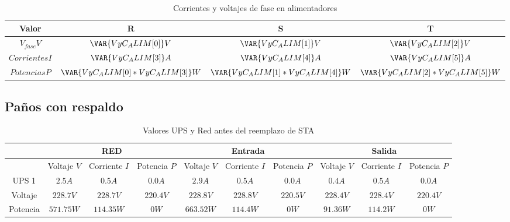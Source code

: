 \documentclass{article}
\begin{document}
\begin{center}
    \begin{table}[H]
        \centering
        \begin{tabular}{c c c c}
            Valor & R & S & T \\\hline
            $V_{fase}V$ & $\VAR{VyC_ALIM[0]} V$ & $\VAR{VyC_ALIM[1]} V$  & $\VAR{VyC_ALIM[2]} V$ \\
            $Corrientes I$ & $\VAR{VyC_ALIM[3]} A$  & $\VAR{VyC_ALIM[4]} A$  & $\VAR{VyC_ALIM[5]} A$ \\
	    $Potencias P$ & $\VAR{VyC_ALIM[0]*VyC_ALIM[3]} W$ & $\VAR{VyC_ALIM[1]*VyC_ALIM[4]} W$  & $\VAR{VyC_ALIM[2]*VyC_ALIM[5]} W$ 
        \end{tabular}
        \caption{Corrientes y voltajes de fase en alimentadores}
        \label{tab:alimentadores}
    \end{table}
\end{center}

\subsection{Paños con respaldo}

\begin{center}
    \begin{table}[H]
        \centering
        \begin{tabular}{c | c c c | c c c | c c c}
             & \multicolumn{3}{c}{RED} & \multicolumn{3}{c}{Entrada} & \multicolumn{3}{c}{Salida}  \\\hline
            & Voltaje $V$ & Corriente $I$ & Potencia $P$& Voltaje $V$ & Corriente $I$ & Potencia $P$& Voltaje $V$ & Corriente $I$ & Potencia $P$ \\ 
            UPS 1 & $2.5 A$ & $0.5 A$ & $0.0 A$ & $2.9 A$ & $0.5 A$ & $0.0 A$ & $0.4 A$ & $0.5 A$ & $0.0 A$\\
            
            Voltaje & $228.7 V$ & $228.7 V$ & $220.4 V$ & $228.8 V$ & $228.8 V$ & $220.5 V $ & $228.4 V$ & $ 228.4 V$ & $ 220.4 V$ \\ 
            Potencia & $ 571.75 W $ & $114.35 W$ & $0 W$ & $ 663.52 W$ & $114.4 W$ & $0 W$ & $91.36 W$ & $114.2 W$ & $0 W$ \\
        \end{tabular}
        \caption{Valores UPS y Red antes del reemplazo de STA}
        \label{tab:UPSes}
    \end{table}
\end{center}
\end{document}
